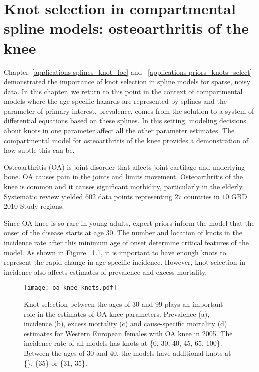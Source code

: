 \chapter{Knot selection in compartmental spline models: osteoarthritis of the knee}
\label{applications-con_fit_splines}

Chapter~\ref{applications-splines_knot_loc} and
~\ref{applications-priors_knots_select} demonstrated the importance of
knot selection in spline models for sparse, noisy data. In this
chapter, we return to this point in the context of compartmental
models where the age-specific hazards are represented by splines and
the parameter of primary interest, prevalence, comes from the solution
to a system of differential equations based on these splines. In this
setting, modeling decisions about knots in one parameter affect all
the other parameter estimates.  The compartmental model for
osteoarthritis of the knee provides a demonstration of how subtle this
can be.

Osteoarthritis (OA) is joint disorder that affects joint cartilage and
underlying bone.  OA causes pain in the joints and limits movement.
Osteoarthritis of the knee is common and it causes significant
morbidity, particularly in the
elderly. \cite{felson_epidemiology_1988, felson_incidence_1995}
Systematic review yielded $602$ data points representing $27$ countries
in $10$ GBD 2010 Study regions.

Since OA knee is so rare in young adults, expert priors inform the
model that the onset of the disease starts at age 30.  The number and
location of knots in the incidence rate after this minimum age of
onset determine critical features of the model. As shown in Figure
~\ref{fig:app-oa knee knots}, it is important to have enough knots to
represent the rapid change in age-specific incidence.  However, knot
selection in incidence also affects estimates of prevalence and
excess mortality.

    \begin{figure}[h]
        \begin{center}
            \texttt{[image: oa\_knee-knots.pdf]}
            \caption{Knot selection between the ages of 30 and 99
              plays an important role in the estimates of OA knee
              parameters.  Prevalence (a), incidence (b),
              excess mortality (c) and cause-specific mortality (d)
              estimates for Western European females
              with OA knee in 2005.  The
              incidence rate of all models has knots at \{0, 30,
              40, 45, 65, 100\}.  Between the ages
              of 30 and 40, the models have additional knots at \{\}, \{35\}
              or \{31, 35\}.}
            \label{fig:app-oa knee knots}
        \end{center}
    \end{figure}

